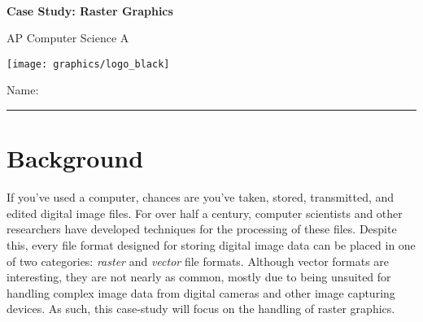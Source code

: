 

\def\CaseStudyCourse{AP Computer Science A}
\def\CaseStudyNumber{01}
\def\CaseStudyTitle{Raster Graphics}


	\begin{coverpages}
		\ \\[2cm]
		\begin{center}
			\huge
			\textbf{Case Study: \CaseStudyTitle}

			\Large
			\CaseStudyCourse
		\end{center}

		\vspace{1.5cm}

		\begin{center}
			\texttt{[image: graphics/logo\_black]}

			\vspace{2.5cm}

			\Large
			Name: \rule{11.5cm}{0.1pt}
		\end{center}
	\end{coverpages}

	\blankpage

	\thispagestyle{empty}
	\tableofcontents

	\pagebreak

  \section{Background}
    If you've used a computer, chances are you've taken, stored, transmitted, and edited digital image files. For over half a century, computer scientists and other researchers have developed techniques for the processing of these files. Despite this, every file format designed for storing digital image data can be placed in one of two categories: \emph{raster} and \emph{vector} file formats. Although vector formats are interesting, they are not nearly as common, mostly due to being unsuited for handling complex image data from digital cameras and other image capturing devices. As such, this case-study will focus on the handling of raster graphics.

